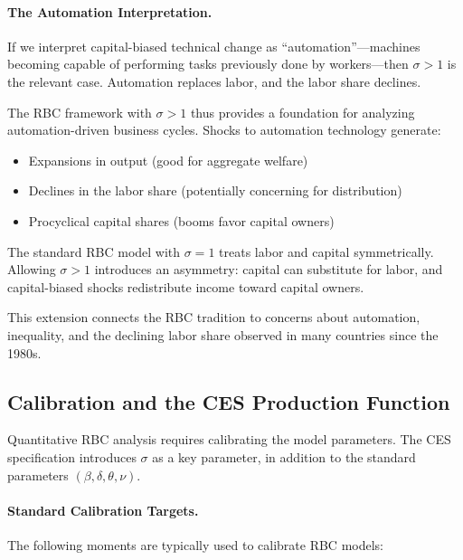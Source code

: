 \paragraph{The Automation Interpretation.}
If we interpret capital-biased technical change as ``automation''---machines becoming capable of performing tasks previously done by workers---then $\sigma > 1$ is the relevant case. Automation replaces labor, and the labor share declines.

The RBC framework with $\sigma > 1$ thus provides a foundation for analyzing automation-driven business cycles. Shocks to automation technology generate:
\begin{itemize}[nosep]
\item Expansions in output (good for aggregate welfare)
\item Declines in the labor share (potentially concerning for distribution)
\item Procyclical capital shares (booms favor capital owners)
\end{itemize}

\begin{calloutimportant}
The standard RBC model with $\sigma = 1$ treats labor and capital symmetrically. Allowing $\sigma > 1$ introduces an asymmetry: capital can substitute for labor, and capital-biased shocks redistribute income toward capital owners.

This extension connects the RBC tradition to concerns about automation, inequality, and the declining labor share observed in many countries since the 1980s.
\end{calloutimportant}

\subsection{Calibration and the CES Production Function}
\label{subsec:rbc-calibration}

Quantitative RBC analysis requires calibrating the model parameters. The CES specification introduces $\sigma$ as a key parameter, in addition to the standard parameters $(\beta, \delta, \theta, \nu)$.

\paragraph{Standard Calibration Targets.}
The following moments are typically used to calibrate RBC models:

